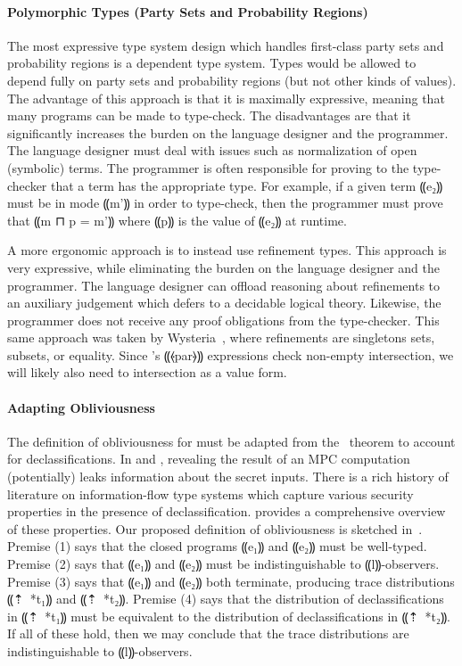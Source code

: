 \paragraph*{Polymorphic Types (Party Sets and Probability Regions)}

The most expressive type system design which handles first-class party sets
and probability regions is a dependent type system. Types would be allowed to
depend fully on party sets and probability regions (but not other kinds of values).
The advantage of this approach is that it is maximally expressive, meaning that
many programs can be made to type-check. The disadvantages are that it significantly
increases the burden on the language designer and the programmer. The language designer
must deal with issues such as normalization of open (symbolic) terms. The programmer
is often responsible for proving to the type-checker that a term has the appropriate type.
For example, if a given term ⸨e₂⸩ must be in mode ⸨m'⸩ in order to type-check, then the
programmer must prove that ⸨m ⊓ p = m'⸩ where ⸨p⸩ is the value of ⸨e₂⸩ at runtime.

A more ergonomic approach is to instead use refinement types. This approach is very expressive,
while eliminating the burden on the language designer and the programmer. The language
designer can offload reasoning about refinements to an auxiliary judgement which defers to
a decidable logical theory. Likewise, the programmer does not receive any proof obligations from
the type-checker. This same approach was taken by Wysteria~\cite{todo},
where refinements are singletons sets, subsets, or equality. Since \lang's ⸨⦑par⦒⸩ expressions
check non-empty intersection, we will likely also need to intersection as a value form.

\paragraph*{Adapting Obliviousness}

The definition of obliviousness for \lang must be adapted from the~ theorem
to account for declassifications. In \mpc and \lang, revealing the result of an MPC computation
(potentially) leaks information about the secret inputs. There is a rich history of literature
on information-flow type systems which capture various security properties in the presence of
declassification. \citet{sabelfeldsandsjcs07} provides a comprehensive overview of these properties.
Our proposed definition of obliviousness is sketched in~. Premise (1) says that
the closed programs ⸨e₁⸩ and ⸨e₂⸩ must be well-typed. Premise (2) says that ⸨e₁⸩ and ⸨e₂⸩ must be
indistinguishable to ⸨l⸩-observers. Premise (3) says that ⸨e₁⸩ and ⸨e₂⸩ both terminate, producing trace
distributions ⸨⇡~*{t₁}⸩ and ⸨⇡~*{t₂}⸩. Premise (4) says that the distribution of declassifications
in ⸨⇡~*{t₁}⸩ must be equivalent to the distribution of declassifications in ⸨⇡~*{t₂}⸩. If all of
these hold, then we may conclude that the trace distributions are indistinguishable to ⸨l⸩-observers.

